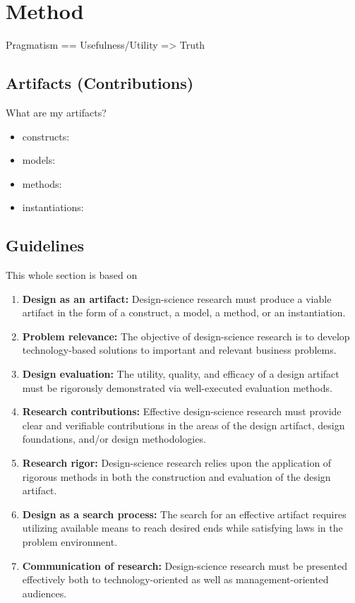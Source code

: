 \chapter{Method}

Pragmatism == Usefulness/Utility => Truth



\section{Artifacts (Contributions)}
What are my artifacts?
\begin{itemize}
    \item constructs: 
    \item models:
    \item methods:
    \item instantiations:
\end{itemize}

\section{Guidelines}

This whole section is based on \cite{Hevner2004}

\begin{enumerate}
    \item \textbf{Design as an artifact:} Design-science research must produce a viable artifact in the form of a construct, a model, a method, or an instantiation.
    \item \textbf{Problem relevance:} The objective of design-science research is to develop technology-based solutions to important and relevant business problems.
    \item \textbf{Design evaluation:} The utility, quality, and efficacy of a design artifact must be rigorously demonstrated via well-executed evaluation methods.
    \item \textbf{Research contributions:} Effective design-science research must provide clear and verifiable contributions in the areas of the design artifact, design foundations, and/or design methodologies.
    \item \textbf{Research rigor:} Design-science research relies upon the application of rigorous methods in both the construction and evaluation of the design artifact.
    \item \textbf{Design as a search process:} The search for an effective artifact requires utilizing available means to reach desired ends while satisfying laws in the problem environment.
    \item \textbf{Communication of research:} Design-science research must be presented effectively both to technology-oriented as well as management-oriented audiences.
\end{enumerate}


